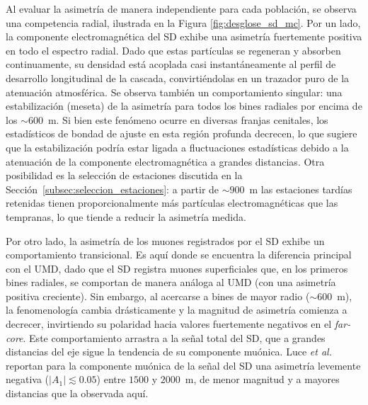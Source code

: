 Al evaluar la asimetría de manera independiente para cada población, {\color{blue}se observa una competencia radial}, ilustrada en la Figura \ref{fig:desglose_sd_mc}. Por un lado, la componente electromagnética del SD exhibe una asimetría fuertemente positiva en todo el espectro radial. Dado que estas partículas se regeneran y absorben continuamente, su densidad está acoplada casi instantáneamente al perfil de desarrollo longitudinal de la cascada, convirtiéndolas en un trazador puro de la atenuación atmosférica. Se observa también un comportamiento singular: una estabilización (meseta) de la asimetría para todos los bines radiales por encima de los $\sim 600$~m. Si bien este fenómeno ocurre en diversas franjas cenitales, los estadísticos de bondad de ajuste en esta región profunda decrecen, lo que sugiere que la estabilización podría estar ligada a fluctuaciones estadísticas debido a la atenuación de la componente electromagnética a grandes distancias. {\color{blue}Otra posibilidad es la selección de estaciones discutida en la Sección~\ref{subsec:seleccion_estaciones}: a partir de $\sim 900$~m las estaciones tardías retenidas tienen proporcionalmente más partículas electromagnéticas que las tempranas, lo que tiende a reducir la asimetría medida.}

Por otro lado, la asimetría de los muones registrados por el SD exhibe un comportamiento transicional. {\color{blue}Es aquí donde se encuentra la diferencia principal con el UMD}, dado que el SD registra muones superficiales que, en los primeros bines radiales, se comportan de manera análoga al UMD (con una asimetría positiva creciente). Sin embargo, al acercarse a bines de mayor radio ($\sim 600$~m), la fenomenología cambia drásticamente y la magnitud de asimetría comienza a decrecer, invirtiendo su polaridad hacia valores fuertemente negativos en el \textit{far-core}. {\color{blue}Este comportamiento arrastra a la señal total del SD, que a grandes distancias del eje sigue la tendencia de su componente muónica. Luce \textit{et al.} \cite{Luce_ICRC2021} reportan para la componente muónica de la señal del SD una asimetría levemente negativa ($|A_1| \lesssim 0.05$) entre $1500$ y $2000$~m, de menor magnitud y a mayores distancias que la observada aquí.}

